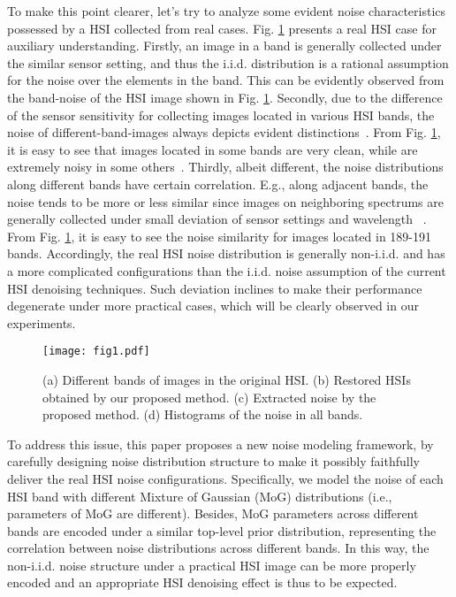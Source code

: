 \documentclass[journal]{IEEEtran}
\begin{document}
To make this point clearer, let's try to analyze some evident noise characteristics possessed by a HSI collected from real cases. Fig. \ref{fig1} presents a real HSI case for auxiliary understanding. Firstly, an image in a band is generally collected under the similar sensor setting, and thus the i.i.d. distribution is a rational assumption for the noise over the elements in the band. This can be evidently observed from the band-noise of the HSI image shown in Fig. \ref{fig1}. Secondly, due to the difference of the sensor sensitivity for collecting images located in various HSI bands, the noise of different-band-images always depicts evident distinctions~\cite{he2015hyperspectral}. From Fig. \ref{fig1}, it is easy to see that images located in some bands are very clean, while are extremely noisy in some others~\cite{zelinski2006denoising,goetz2009three}. Thirdly, albeit different, the noise distributions along different bands have certain correlation. E.g., along adjacent bands, the noise tends to be more or less similar since images on neighboring spectrums are generally collected under small deviation of sensor settings and wavelength ~\cite{zhong2013multiple}. From Fig. \ref{fig1}, it is easy to see the noise similarity for images located in 189-191 bands. Accordingly, the real HSI noise distribution is generally non-i.i.d. and has a more complicated configurations than the i.i.d. noise assumption of the current HSI denoising techniques. Such deviation inclines to make their performance degenerate under more practical cases, which will be clearly observed in our experiments.

\begin{figure}[t]
	\centering
	\texttt{[image: fig1.pdf]}
\vspace{-6mm}
	\caption{(a) Different bands of images in the original HSI. (b) Restored HSIs obtained by our proposed method. (c) Extracted noise by the proposed method. (d) Histograms of the noise in all bands. \label{fig1} }
\end{figure}


To address this issue, this paper proposes a new noise modeling framework, by carefully designing noise distribution structure to make it possibly faithfully deliver the real HSI noise configurations. Specifically, we model the noise of each HSI band with different Mixture of Gaussian (MoG) distributions (i.e., parameters of MoG are different). Besides, MoG parameters across different bands are encoded under a similar top-level prior distribution, representing the correlation between noise distributions across different bands. In this way, the non-i.i.d. noise structure under a practical HSI image can be more properly encoded and an appropriate HSI denoising effect is thus to be expected.
\end{document}
